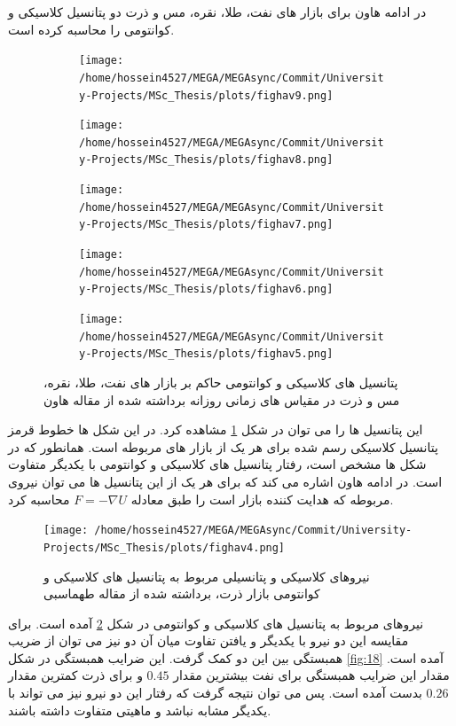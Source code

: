 \documentclass[a4paper,titlepage,12pt,fleqn,oneside]{report}
\begin{document}
	در ادامه هاون برای بازار های نفت، طلا، نقره، مس و ذرت دو پتانسیل کلاسیکی و کوانتومی را محاسبه کرده است. 
	\begin{figure}[ptb]
		\begin{subfigure}[b]{0.5\textwidth}
			\renewcommand\thesubfigure{i}
			\centering
			\texttt{[image: /home/hossein4527/MEGA/MEGAsync/Commit/University-Projects/MSc\_Thesis/plots/fighav9.png]}
		\end{subfigure}
		\hfill
		\begin{subfigure}[b]{0.5\textwidth}
			\renewcommand\thesubfigure{i}
			\centering
			\texttt{[image: /home/hossein4527/MEGA/MEGAsync/Commit/University-Projects/MSc\_Thesis/plots/fighav8.png]}
		\end{subfigure}
		\hfill
		\begin{subfigure}[b]{0.5\textwidth}
			\renewcommand\thesubfigure{i}
			\centering
			\texttt{[image: /home/hossein4527/MEGA/MEGAsync/Commit/University-Projects/MSc\_Thesis/plots/fighav7.png]}
		\end{subfigure}
		\hfill
		\hfill
		\begin{subfigure}[b]{0.5\textwidth}
			\renewcommand\thesubfigure{i}
			\centering
			\texttt{[image: /home/hossein4527/MEGA/MEGAsync/Commit/University-Projects/MSc\_Thesis/plots/fighav6.png]}
		\end{subfigure}
		\hfill
		\hfill
		\begin{subfigure}[b]{0.5\textwidth}
			\renewcommand\thesubfigure{i}
			\centering
			\texttt{[image: /home/hossein4527/MEGA/MEGAsync/Commit/University-Projects/MSc\_Thesis/plots/fighav5.png]}
		\end{subfigure}
		\hfill
		
		\caption{پتانسیل های کلاسیکی و کوانتومی حاکم بر بازار های نفت، طلا، نقره، مس و ذرت در مقیاس های زمانی روزانه برداشته شده از مقاله هاون
			\cite{shen}}
		\label{fig:16}
	\end{figure}
	این پتانسیل ها را می توان در شکل 
	\ref{fig:16}
	مشاهده کرد. 
	در این شکل ها خطوط قرمز پتانسیل کلاسیکی رسم شده برای هر یک از بازار های مربوطه است. همانطور که در شکل ها مشخص است، رفتار پتانسیل های کلاسیکی و کوانتومی با یکدیگر متفاوت است. در ادامه هاون اشاره می کند که برای هر یک از این پتانسیل ها می توان نیروی مربوطه که هدایت کننده بازار است را طبق معادله
	$F=-\nabla U$
	محاسبه کرد.
	\begin{figure}[ptb]
		\centering
		\texttt{[image: /home/hossein4527/MEGA/MEGAsync/Commit/University-Projects/MSc\_Thesis/plots/fighav4.png]}
		\caption{نیروهای کلاسیکی و پتانسیلی مربوط به پتانسیل های کلاسیکی و کوانتومی بازار ذرت،
			برداشته شده از مقاله طهماسبی \cite{tahmaseb}
		}
		\label{fig:17}
	\end{figure}
	نیروهای مربوط به پتانسیل های کلاسیکی و کوانتومی در شکل
	\ref{fig:17}
	آمده است. برای مقایسه این دو نیرو با یکدیگر و یافتن تفاوت میان آن دو نیز می توان از ضریب همبستگی بین این دو کمک گرفت. این ضرایب همبستگی در شکل 
	\ref{fig:18}
	آمده است. مقدار این ضرایب همبستگی برای نفت بیشترین مقدار 
	$0.45$
	و برای ذرت کمترین مقدار 
	$0.26$
	بدست آمده است. 
	پس می توان نتیجه گرفت که رفتار این دو نیرو نیز می تواند با یکدیگر مشابه نباشد و ماهیتی متفاوت داشته باشند. 
	
\end{document}

